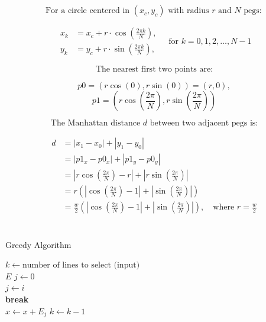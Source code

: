 \chapter{}
\label{app:d}

\[
\text{For a circle centered in } (x_c, y_c) \text{ with radius } r \text{ and } N \text{ pegs}:
\]

\[
\begin{aligned}
x_k &= x_c + r \cdot \cos\left( \frac{2\pi k}{N} \right), \\
y_k &= y_c + r \cdot \sin\left( \frac{2\pi k}{N} \right),
\end{aligned}
\quad \text{for } k = 0, 1, 2, \dots, N - 1
\]

\[
\text{The nearest first two points are:}
\]

\[
p0 = (r\cos(0), r\sin(0)) = (r, 0),
\]
\[
p1 = (r\cos(\frac{2\pi}{N}), r\sin(\frac{2\pi}{N}))
\]

\[\text{The Manhattan distance } d \text{ between two adjacent pegs is:}\]

\[
\begin{aligned}
d &= \left| x_1 - x_0 \right| + \left| y_1 - y_0 \right| \\
  &= \left| p1_x - p0_x \right| + \left| p1_y - p0_y \right| \\
  &= \left| r\cos\left(\frac{2\pi}{N}\right) - r \right| + \left| r\sin\left(\frac{2\pi}{N}\right) \right| \\
  &= r\left( \left| \cos\left(\frac{2\pi}{N}\right) - 1 \right| + \left| \sin\left(\frac{2\pi}{N}\right) \right| \right) \\
  &= \frac{w}{2} \left( \left| \cos\left(\frac{2\pi}{N}\right) - 1 \right| + \left| \sin\left(\frac{2\pi}{N}\right) \right| \right), \quad \text{where } r = \frac{w}{2}
\end{aligned}
\]

\chapter{}
\label{app:greedy}

\begin{algorithm}
\caption{Greedy Algorithm}
\begin{algorithmic}[1]
\State $k \gets \text{number of lines to select (input)}$ \\

    \State $E$ 
    \State $j \gets 0$  \\
            \State $j \gets i$
        \EndIf
    \EndFor \\

        \State \textbf{break}
    \EndIf \\

    \State $x \gets x + E_j$
    \State $k \gets k - 1$
\EndWhile
\end{algorithmic}
\end{algorithm}

